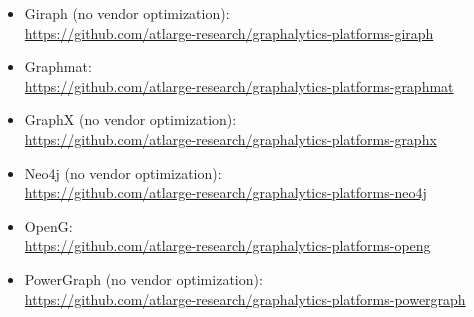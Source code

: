 \begin{itemize}
	\item Giraph (no vendor optimization): \\\url{https://github.com/atlarge-research/graphalytics-platforms-giraph}
	\item Graphmat: \\\url{https://github.com/atlarge-research/graphalytics-platforms-graphmat}
	\item GraphX (no vendor optimization): \\\url{https://github.com/atlarge-research/graphalytics-platforms-graphx}
	\item Neo4j (no vendor optimization): \\\url{https://github.com/atlarge-research/graphalytics-platforms-neo4j}
	\item OpenG: \\\url{https://github.com/atlarge-research/graphalytics-platforms-openg}
	\item PowerGraph (no vendor optimization): \\\url{https://github.com/atlarge-research/graphalytics-platforms-powergraph}
\end{itemize}

